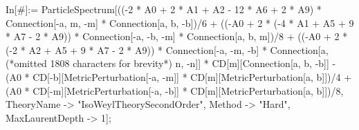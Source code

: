 In[\#]:= ParticleSpectrum[((-2 * A0 + 2 * A1 + A2 - 12 * A6 + 2 * A9) * Connection[-a, m, -m] * Connection[a, b, -b])/6 + ((-A0 + 2 * (-4 * A1 + A5 + 9 * A7 - 2 * A9)) * Connection[-a, -b, -m] * Connection[a, b, m])/8 + ((-A0 + 2 * (-2 * A2 + A5 + 9 * A7 - 2 * A9)) * Connection[-a, -m, -b] * Connection[a, (*omitted 1808 characters for brevity*) n, -n]] * CD[m][Connection[a, b, -b]] - (A0 * CD[-b][MetricPerturbation[-a, -m]] * CD[m][MetricPerturbation[a, b]])/4 + (A0 * CD[-m][MetricPerturbation[-a, -b]] * CD[m][MetricPerturbation[a, b]])/8, TheoryName -> "IsoWeylTheorySecondOrder", Method -> "Hard", MaxLaurentDepth -> 1];